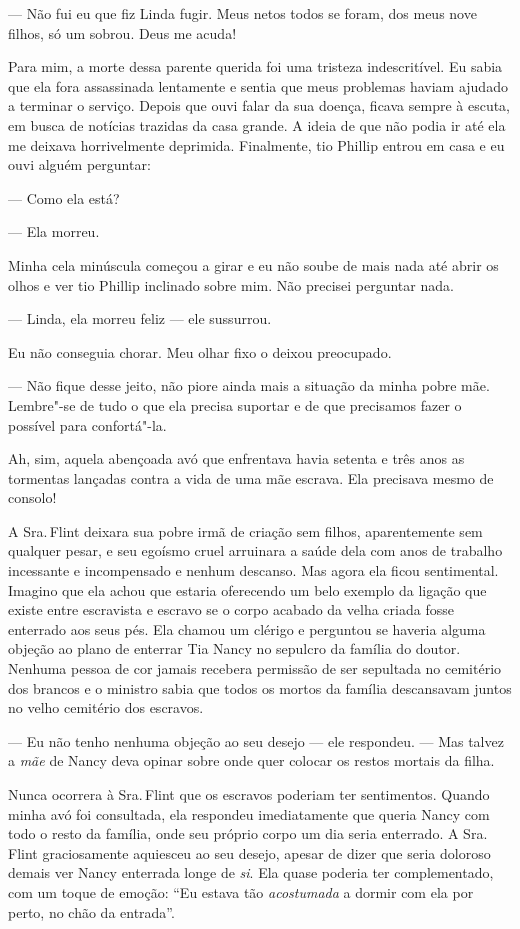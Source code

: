 --- Não fui eu que fiz Linda fugir. Meus netos todos se foram, dos meus
nove filhos, só um sobrou. Deus me acuda!

Para mim, a morte dessa parente querida
foi uma tristeza indescritível. Eu sabia que ela fora assassinada
lentamente e sentia que meus problemas haviam ajudado a terminar o
serviço. Depois que ouvi falar da sua doença, ficava sempre à escuta, em
busca de notícias trazidas da casa grande. A ideia de que não podia ir
até ela me deixava horrivelmente deprimida. Finalmente, tio Phillip
entrou em casa e eu ouvi alguém perguntar:

--- Como ela está?

--- Ela morreu.

Minha cela minúscula começou a girar e eu não soube de mais nada até
abrir os olhos e ver tio Phillip inclinado sobre mim. Não precisei
perguntar nada.

--- Linda, ela morreu feliz --- ele sussurrou.

Eu não conseguia chorar. Meu olhar fixo o deixou preocupado.

--- Não fique desse jeito, não piore ainda mais a situação da minha
pobre mãe. Lembre"-se de tudo o que ela precisa suportar e de que
precisamos fazer o possível para confortá"-la.

Ah, sim, aquela abençoada avó que enfrentava havia setenta e três anos
as tormentas lançadas contra a vida de uma mãe escrava. Ela precisava
mesmo de consolo!

A Sra.\,Flint deixara sua pobre irmã de
criação sem filhos, aparentemente sem qualquer pesar, e seu egoísmo
cruel arruinara a saúde dela com anos de trabalho incessante e
incompensado e nenhum descanso. Mas agora ela ficou sentimental. Imagino
que ela achou que estaria oferecendo um belo exemplo da ligação que
existe entre escravista e escravo se o corpo acabado da velha criada
fosse enterrado aos seus pés. Ela chamou um clérigo e perguntou se
haveria alguma objeção ao plano de enterrar Tia Nancy no sepulcro da
família do doutor. Nenhuma pessoa de cor jamais recebera permissão de
ser sepultada no cemitério dos brancos e o ministro sabia que todos os
mortos da família descansavam juntos no velho cemitério dos escravos.

--- Eu não tenho nenhuma objeção ao seu desejo --- ele respondeu. ---
Mas talvez a \emph{mãe} de Nancy deva opinar sobre onde quer colocar os
restos mortais da filha.

Nunca ocorrera à Sra.\,Flint que os
escravos poderiam ter sentimentos. Quando minha avó foi consultada, ela
respondeu imediatamente que queria Nancy com todo o resto da família,
onde seu próprio corpo um dia seria enterrado. A Sra.\,Flint
graciosamente aquiesceu ao seu desejo, apesar de dizer que seria
doloroso demais ver Nancy enterrada longe de \emph{si}. Ela quase
poderia ter complementado, com um toque de emoção: ``Eu estava tão
\emph{acostumada} a dormir com ela por perto, no chão da entrada''.

